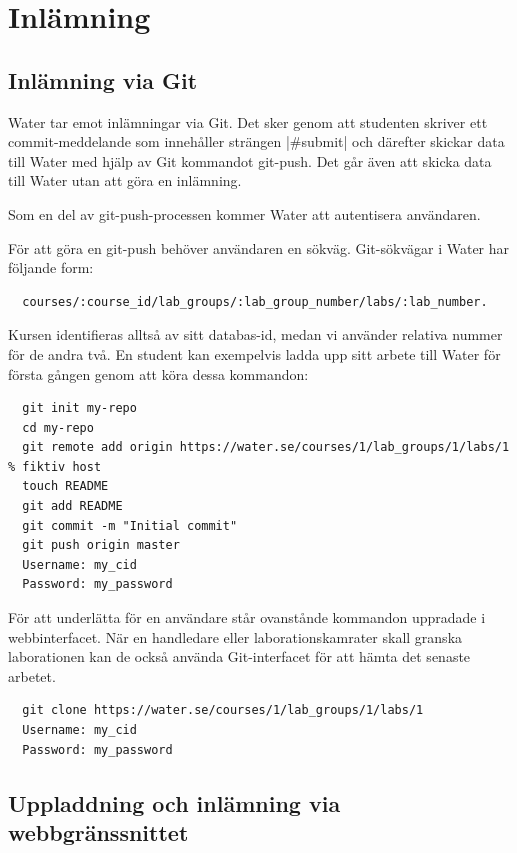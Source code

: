\section{Inlämning}
\subsection{Inlämning via Git}

Water tar emot inlämningar via Git. Det sker genom att studenten skriver ett commit-meddelande som innehåller strängen |\#submit| och därefter skickar data till Water med hjälp av Git kommandot git-push. Det går även att skicka data till Water utan att göra en inlämning.

Som en del av git-push-processen kommer Water att autentisera användaren. 

För att göra en git-push behöver användaren en sökväg.
Git-sökvägar i Water har följande form:

\begin{verbatim}
  courses/:course_id/lab_groups/:lab_group_number/labs/:lab_number.
\end{verbatim}

Kursen identifieras alltså av sitt databas-id, medan vi använder relativa nummer för de andra två. En student kan exempelvis ladda upp sitt arbete till Water för första gången genom att köra dessa kommandon:

\begin{verbatim}
  git init my-repo
  cd my-repo
  git remote add origin https://water.se/courses/1/lab_groups/1/labs/1 % fiktiv host
  touch README
  git add README
  git commit -m "Initial commit"
  git push origin master
  Username: my_cid
  Password: my_password  
\end{verbatim}

För att underlätta för en användare står ovanstånde kommandon uppradade i webbinterfacet. När en handledare eller laborationskamrater skall granska laborationen kan de också använda Git-interfacet för att hämta det senaste arbetet.

\begin{verbatim}
  git clone https://water.se/courses/1/lab_groups/1/labs/1
  Username: my_cid
  Password: my_password
\end{verbatim}

\subsection{Uppladdning och inlämning via webbgränssnittet}

